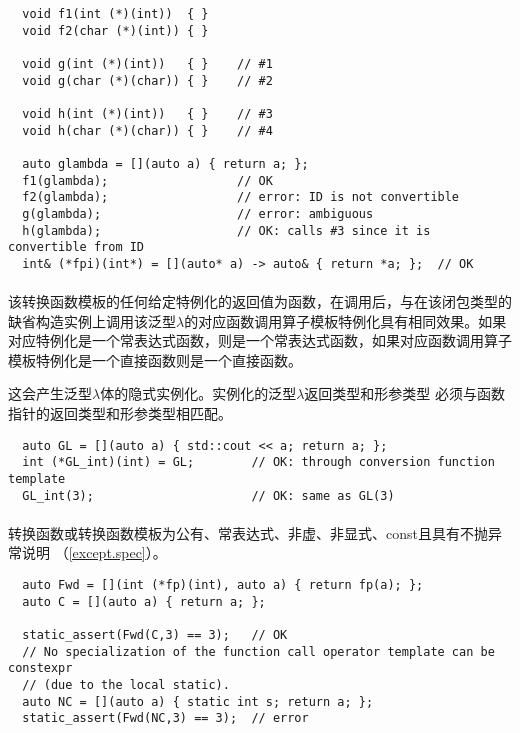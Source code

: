 \begin{example}
  \begin{lstlisting}
  void f1(int (*)(int))  { }
  void f2(char (*)(int)) { }

  void g(int (*)(int))   { }    // #1
  void g(char (*)(char)) { }    // #2

  void h(int (*)(int))   { }    // #3
  void h(char (*)(char)) { }    // #4

  auto glambda = [](auto a) { return a; };
  f1(glambda);                  // OK
  f2(glambda);                  // error: ID is not convertible
  g(glambda);                   // error: ambiguous
  h(glambda);                   // OK: calls #3 since it is convertible from ID
  int& (*fpi)(int*) = [](auto* a) -> auto& { return *a; };  // OK
  \end{lstlisting}
\end{example}

\paragraph{} %
该转换函数模板的任何给定特例化的返回值为函数，在调用后，与在该闭包类型的
缺省构造实例上调用该泛型$\lambda$的对应函数调用算子模板特例化具有相同效果。如果
对应特例化是一个常表达式函数，则是一个常表达式函数，如果对应函数调用算子
模板特例化是一个直接函数则是一个直接函数。

\begin{note}
  这会产生泛型$\lambda$体的隐式实例化。实例化的泛型$\lambda$返回类型和形参类型
  必须与函数指针的返回类型和形参类型相匹配。
\end{note}

\begin{example}
  \begin{lstlisting}
  auto GL = [](auto a) { std::cout << a; return a; };
  int (*GL_int)(int) = GL;        // OK: through conversion function template
  GL_int(3);                      // OK: same as GL(3)
  \end{lstlisting}
\end{example}

\paragraph{} %
转换函数或转换函数模板为公有、常表达式、非虚、非显式、const且具有不抛异常说明
（\ref{except.spec}）。

\begin{example}
  \begin{lstlisting}
  auto Fwd = [](int (*fp)(int), auto a) { return fp(a); };
  auto C = [](auto a) { return a; };

  static_assert(Fwd(C,3) == 3);   // OK
  // No specialization of the function call operator template can be constexpr
  // (due to the local static).
  auto NC = [](auto a) { static int s; return a; };
  static_assert(Fwd(NC,3) == 3);  // error
  \end{lstlisting}
\end{example}


